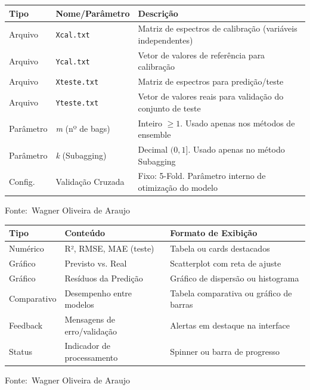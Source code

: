 \documentclass[12pt,a4paper]{article}
\newcommand{\oautor}{Wagner Oliveira de Araujo}
\begin{document}
\begin{quadro}[ht]
\centering
\small
\caption{Entradas necessárias para execução do sistema}
\label{quadro:entradas}
\begin{threeparttable}
\begin{tabularx}{\textwidth}{|l|l|X|} \hline
\textbf{Tipo} & \textbf{Nome/Parâmetro} & \textbf{Descrição} \\ \hline
Arquivo & \texttt{Xcal.txt} & Matriz de espectros de calibração (variáveis independentes) \\ \hline
Arquivo & \texttt{Ycal.txt} & Vetor de valores de referência para calibração \\ \hline
Arquivo & \texttt{Xteste.txt} & Matriz de espectros para predição/teste \\ \hline
Arquivo & \texttt{Yteste.txt} & Vetor de valores reais para validação do conjunto de teste \\ \hline
Parâmetro & \textit{m} (nº de bags) & Inteiro $\ge 1$. Usado apenas nos métodos de ensemble \\ \hline
Parâmetro & \textit{k} (Subagging) & Decimal $(0, 1]$. Usado apenas no método Subagging \\ \hline
Config. & Validação Cruzada & Fixo: 5-Fold. Parâmetro interno de otimização do modelo \\ \hline
\end{tabularx}
\begin{tablenotes}[flushleft]
\footnotesize
\item Fonte:~\oautor
\end{tablenotes}
\end{threeparttable}
\end{quadro}

\begin{quadro}[ht]
\centering
\small
\caption{Saídas esperadas do sistema}
\label{quadro:saidas}
\begin{threeparttable}
\begin{tabularx}{\textwidth}{|l|l|X|} \hline
\textbf{Tipo} & \textbf{Conteúdo} & \textbf{Formato de Exibição} \\ \hline
Numérico & R², RMSE, MAE (teste) & Tabela ou cards destacados \\ \hline
Gráfico & Previsto vs. Real & Scatterplot com reta de ajuste \\ \hline
Gráfico & Resíduos da Predição & Gráfico de dispersão ou histograma \\ \hline
Comparativo & Desempenho entre modelos & Tabela comparativa ou gráfico de barras \\ \hline
Feedback & Mensagens de erro/validação & Alertas em destaque na interface \\ \hline
Status & Indicador de processamento & Spinner ou barra de progresso \\ \hline
\end{tabularx}
\begin{tablenotes}[flushleft]
\footnotesize
\item Fonte:~\oautor
\end{tablenotes}
\end{threeparttable}
\end{quadro}
\end{document}

